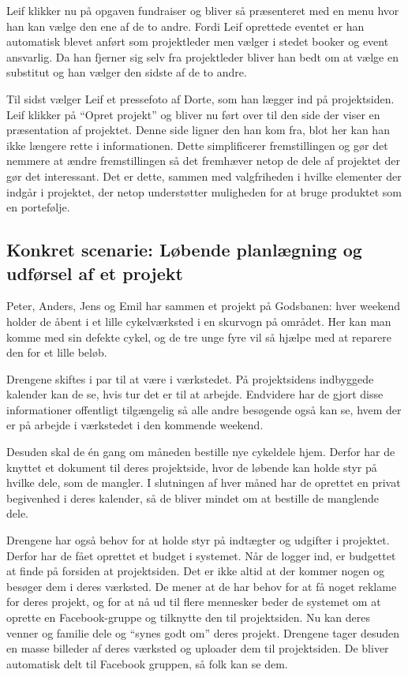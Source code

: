 Leif klikker nu på opgaven fundraiser og bliver så præsenteret med en menu hvor han kan vælge den ene af de to andre. Fordi Leif oprettede eventet er han automatisk blevet anført som projektleder men vælger i stedet booker og event ansvarlig. Da han fjerner sig selv fra projektleder bliver han bedt om at vælge en substitut og han vælger den sidste af de to andre.

Til sidst vælger Leif et pressefoto af Dorte, som han lægger ind på projektsiden. Leif klikker på “Opret projekt” og bliver nu ført over til den side der viser en præsentation af projektet. Denne side ligner den han kom fra, blot her kan han ikke længere rette i informationen. Dette simplificerer fremstillingen og gør det nemmere at ændre fremstillingen så det fremhæver netop de dele af projektet der gør det interessant. Det er dette, sammen med valgfriheden i hvilke elementer der indgår i projektet, der netop understøtter muligheden for at bruge produktet som en portefølje.

\subsection{Konkret scenarie: Løbende planlægning og udførsel af et projekt}
Peter, Anders, Jens og Emil har sammen et projekt på Godsbanen: hver weekend holder de åbent i et lille cykelværksted i en skurvogn på området. Her kan man komme med sin defekte cykel, og de tre unge fyre vil så hjælpe med at reparere den for et lille beløb.

Drengene skiftes i par til at være i værkstedet. På projektsidens indbyggede kalender kan de se, hvis tur det er til at arbejde. Endvidere har de gjort disse informationer offentligt tilgængelig så alle andre besøgende også kan se, hvem der er på arbejde i værkstedet i den kommende weekend.

Desuden skal de én gang om måneden bestille nye cykeldele hjem. Derfor har de knyttet et dokument til deres projektside, hvor de løbende kan holde styr på hvilke dele, som de mangler. I slutningen af hver måned har de oprettet en privat begivenhed i deres kalender, så de bliver mindet om at bestille de manglende dele.

Drengene har også behov for at holde styr på indtægter og udgifter i projektet. Derfor har de fået oprettet et budget i systemet. Når de logger ind, er budgettet at finde på forsiden at projektsiden.
Det er ikke altid at der kommer nogen og besøger dem i deres værksted. De mener at de har behov for at få noget reklame for deres projekt, og for at nå ud til flere mennesker beder de systemet om at oprette en Facebook-gruppe og tilknytte den til projektsiden. Nu kan deres venner og familie dele og “synes godt om” deres projekt. Drengene tager desuden en masse billeder af deres værksted og uploader dem til projektsiden. De bliver automatisk delt til Facebook gruppen, så folk kan se dem.

